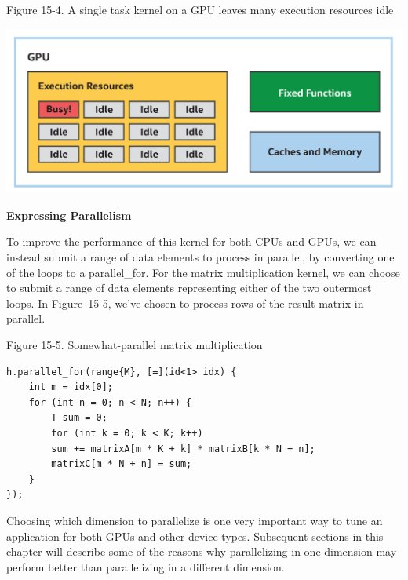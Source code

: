 \hspace*{\fill} \par %
Figure 15-4. A single task kernel on a GPU leaves many execution resources idle
\begin{center}
	\includegraphics[width=1.0\textwidth]{content/chapter-15/images/4}
\end{center}

\hspace*{\fill} \par %
\textbf{Expressing Parallelism}

To improve the performance of this kernel for both CPUs and GPUs, we can instead submit a range of data elements to process in parallel, by converting one of the loops to a parallel\_for. For the matrix multiplication kernel, we can choose to submit a range of data elements representing either of the two outermost loops. In Figure 15-5, we’ve chosen to process rows of the result matrix in parallel.\par

\hspace*{\fill} \par %
Figure 15-5. Somewhat-parallel matrix multiplication
\begin{lstlisting}[caption={}]
h.parallel_for(range{M}, [=](id<1> idx) {
	int m = idx[0];
	for (int n = 0; n < N; n++) {
		T sum = 0;
		for (int k = 0; k < K; k++)
		sum += matrixA[m * K + k] * matrixB[k * N + n];
		matrixC[m * N + n] = sum;
	}
});
\end{lstlisting}

\begin{tcolorbox}[colback=blue!5!white,colframe=blue!75!black, title=CHOOSING HOW TO PARALLELIZE]
Choosing which dimension to parallelize is one very important way to tune an application for both GPUs and other device types. Subsequent sections in this chapter will describe some of the reasons why parallelizing in one dimension may perform better than parallelizing in a different dimension.
\end{tcolorbox}

